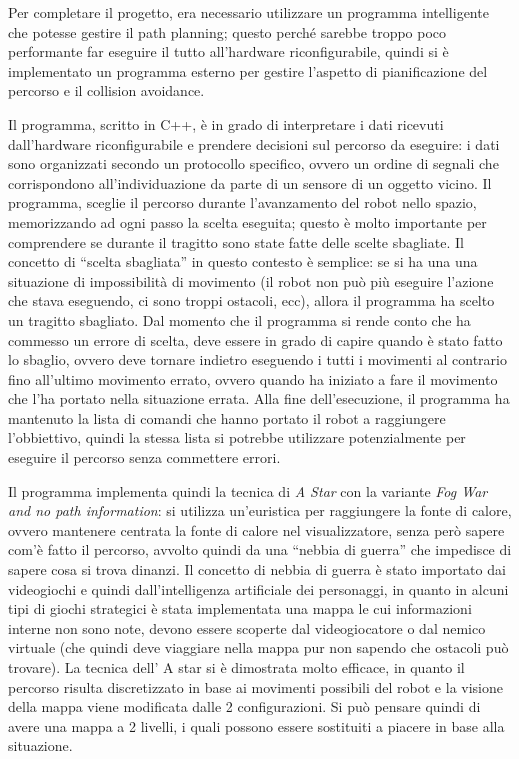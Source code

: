 \documentclass[11pt]{article} %
\begin{document}
Per completare il progetto, era necessario utilizzare un programma intelligente che potesse gestire il path planning; questo perché sarebbe troppo poco performante far eseguire il tutto all'hardware riconfigurabile, quindi si è implementato un programma esterno per gestire l'aspetto di pianificazione del percorso e il collision avoidance.

Il programma, scritto in C++, è in grado di interpretare i dati ricevuti dall'hardware riconfigurabile e prendere decisioni sul percorso da eseguire: i dati sono organizzati secondo un protocollo specifico, ovvero un ordine di segnali che corrispondono all'individuazione da parte di un sensore di un oggetto vicino. Il programma, sceglie il percorso durante l'avanzamento del robot nello spazio, memorizzando ad ogni passo la scelta eseguita; questo è molto importante per comprendere se durante il tragitto sono state fatte delle scelte sbagliate.
Il concetto di ``scelta sbagliata'' in questo contesto è semplice: se si ha una una situazione di impossibilità di movimento (il robot non può più eseguire l'azione che stava eseguendo, ci sono troppi ostacoli, ecc), allora il programma ha scelto un tragitto sbagliato. Dal momento che il programma si rende conto che ha commesso un errore di scelta, deve essere in grado di capire quando è stato fatto lo sbaglio, ovvero deve tornare indietro eseguendo i tutti i movimenti al contrario fino all'ultimo movimento errato,
ovvero quando ha iniziato a fare il movimento che l'ha portato nella situazione errata. Alla fine dell'esecuzione, il programma ha mantenuto la lista di comandi che hanno portato il robot a raggiungere l'obbiettivo, quindi la stessa lista si potrebbe utilizzare potenzialmente per eseguire il percorso senza commettere errori.

Il programma implementa quindi la tecnica di \textit{A Star} con la variante \textit{Fog War and no path information}: si utilizza un'euristica per raggiungere la fonte di calore, ovvero mantenere centrata la fonte di calore nel visualizzatore, senza però sapere com'è fatto il percorso, avvolto quindi da una ``nebbia di guerra'' che impedisce di sapere cosa si trova dinanzi. Il concetto di nebbia di guerra è stato importato dai videogiochi e quindi dall'intelligenza artificiale dei personaggi,
in quanto in alcuni tipi di giochi strategici è stata implementata una mappa le cui informazioni interne non sono note, devono essere scoperte dal videogiocatore o dal nemico virtuale (che quindi deve viaggiare nella mappa pur non sapendo che ostacoli può trovare).
La tecnica dell' A star si è dimostrata molto efficace, in quanto il percorso risulta discretizzato in base ai movimenti possibili del robot e la visione della mappa viene modificata dalle 2 configurazioni. Si può pensare quindi di avere una mappa a 2 livelli, i quali possono essere sostituiti a piacere in base alla situazione.
\end{document}
